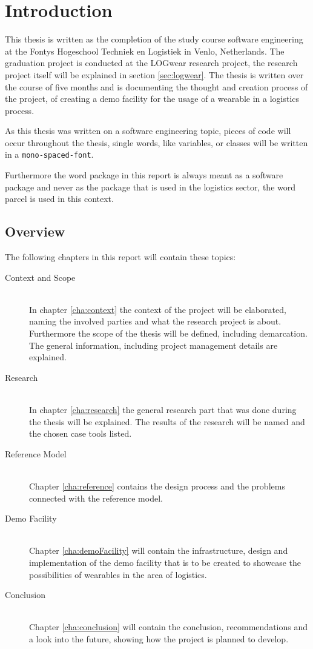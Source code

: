 \chapter{Introduction}
This thesis is written as the completion of the study course software engineering at the Fontys Hogeschool Techniek en Logistiek in Venlo, Netherlands. The graduation project is conducted at the LOGwear research project, the research project itself will be explained in section \ref{sec:logwear}. The thesis is written over the course of five months and is documenting the thought and creation process of the project, of creating a demo facility for the usage of a wearable in a logistics process.

As this thesis was written on a software engineering topic, pieces of code will occur throughout the thesis, single words, like variables, or classes will be written in a \texttt{mono-spaced-font}. 

Furthermore the word \gls{package} in this report is always meant as a software package and never as the package that is used in the logistics sector, the word \gls{parcel} is used in this context.
\section*{Overview}
The following chapters in this report will contain these topics:

\begin{description}
	\item[Context and Scope] \hfill \\
	In chapter \ref{cha:context} the context of the project will be elaborated, naming the involved parties and what the research project is about. Furthermore the scope of the thesis will be defined, including demarcation. The general information, including project management details are explained.
	\item[Research] \hfill \\
	In chapter \ref{cha:research} the general research part that was done during the thesis will be explained. The results of the research will be named and the chosen \gls{case} tools listed.
	\item[Reference Model] \hfill \\
	Chapter \ref{cha:reference} contains the design process and the problems connected with the reference model.
	\item[Demo Facility] \hfill \\
	Chapter \ref{cha:demoFacility} will contain the infrastructure, design and implementation of the demo facility that is to be created to showcase the possibilities of wearables in the area of logistics.
	\item[Conclusion] \hfill \\
	Chapter \ref{cha:conclusion} will contain the conclusion, recommendations and a look into the future, showing how the project is planned to develop.
\end{description}